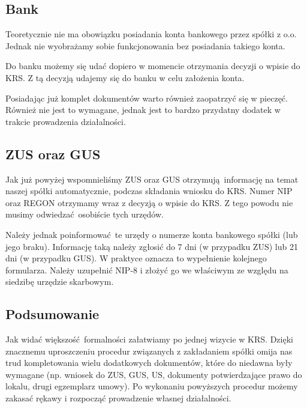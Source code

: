 \subsection{Bank}
Teoretycznie nie ma obowiązku posiadania konta bankowego przez spółki z o.o. Jednak nie wyobrażamy sobie funkcjonowania bez posiadania takiego konta.

Do banku możemy się udać dopiero w momencie otrzymania decyzji o wpisie do KRS. Z tą decyzją udajemy się do banku w celu założenia konta. 

Posiadając już komplet dokumentów warto również zaopatrzyć się w pieczęć. Również nie jest to wymagane, jednak jest to bardzo przydatny dodatek w trakcie prowadzenia działalności.

\subsection{ZUS oraz GUS}
Jak już powyżej wspomnieliśmy ZUS oraz GUS otrzymują informację na temat naszej spółki automatycznie, podczas składania wniosku do KRS. Numer NIP oraz REGON otrzymamy wraz z decyzją o wpisie do KRS. Z tego powodu nie musimy odwiedzać osobiście tych urzędów.

Należy jednak poinformować te urzędy o numerze konta bankowego spółki (lub jego braku). Informację taką należy zgłosić do 7 dni (w przypadku ZUS) lub 21 dni (w przypadku GUS). W praktyce oznacza to wypełnienie kolejnego formularza. Należy uzupełnić NIP-8 i złożyć go we właściwym ze względu na siedzibę urzędzie skarbowym.
 
\subsection{Podsumowanie}
Jak widać większość formalności załatwiamy po jednej wizycie w KRS. Dzięki znacznemu uproszczeniu procedur związanych z zakładaniem spółki omija nas trud kompletowania wielu dodatkowych dokumentów, które do niedawna były wymagane (np. wniosek do ZUS, GUS, US, dokumenty potwierdzające prawo do lokalu, drugi egzemplarz umowy). Po wykonaniu powyższych procedur możemy zakasać rękawy i rozpocząć prowadzenie własnej działalności.

